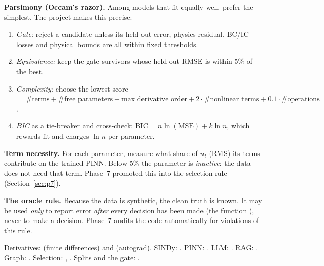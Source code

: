 \textbf{Parsimony (Occam's razor).} Among models that fit equally well, prefer the simplest. The project makes
this precise:
\begin{enumerate}
  \item \emph{Gate:} reject a candidate unless its held-out error, physics residual, BC/IC losses and physical
        bounds are all within fixed thresholds.
  \item \emph{Equivalence:} keep the gate survivors whose held-out RMSE is within 5\% of the best.
  \item \emph{Complexity:} choose the lowest score
        $=\#\text{terms} + \#\text{free parameters} + \text{max derivative order} + 2\cdot\#\text{nonlinear terms}
        + 0.1\cdot\#\text{operations}$.
  \item \emph{BIC} as a tie-breaker and cross-check: $\text{BIC} = n\ln(\text{MSE}) + k\ln n$, which rewards
        fit and charges $\ln n$ per parameter.
\end{enumerate}

\textbf{Term necessity.} For each parameter, measure what share of $u_t$ (RMS) its terms contribute on the
trained PINN. Below 5\% the parameter is \emph{inactive}: the data does not need that term. Phase~7 promoted
this into the selection rule (Section~\ref{sec:p7}).

\textbf{The oracle rule.} Because the data is synthetic, the clean truth is known. It may be used \emph{only}
to report error \emph{after} every decision has been made (the function ), never to make a
decision. Phase~7 audits the code automatically for violations of this rule.

\begin{incode}
Derivatives:  (finite differences) and 
(autograd). SINDy: . PINN: . LLM: . RAG: .
Graph: . Selection: , .
Splits and the gate: .
\end{incode}

